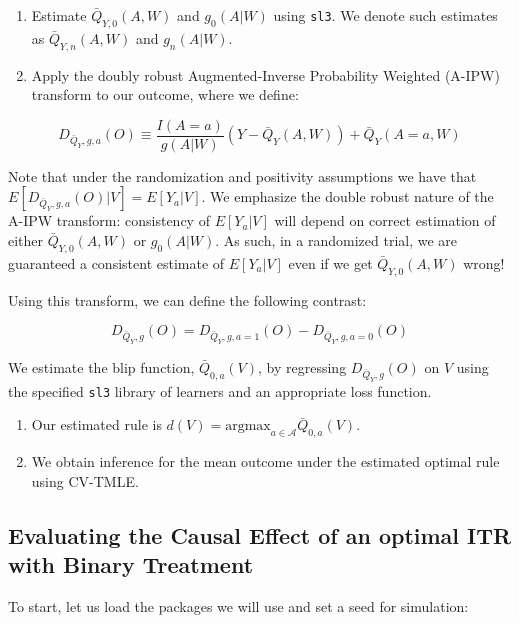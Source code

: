 \documentclass[
  12pt, krantz2,
]{book}
\newcommand{\passthrough}[1]{#1}
\theoremstyle{definition}
\theoremstyle{definition}
\theoremstyle{definition}
\newcommand{\1}{\mathbbm{1}}
\begin{document}
\begin{enumerate}
\def\labelenumi{\arabic{enumi}.}
\item
  Estimate \(\bar{Q}_{Y,0}(A,W)\) and \(g_0(A|W)\) using \passthrough{\lstinline!sl3!}. We denote such
  estimates as \(\bar{Q}_{Y,n}(A,W)\) and \(g_n(A|W)\).
\item
  Apply the doubly robust Augmented-Inverse Probability Weighted (A-IPW)
  transform to our outcome, where we define:
\end{enumerate}

\[D_{\bar{Q}_Y,g,a}(O) \equiv \frac{I(A=a)}{g(A|W)} (Y-\bar{Q}_Y(A,W)) + \bar{Q}_Y(A=a,W)\]

Note that under the randomization and positivity assumptions we have that
\(E[D_{\bar{Q}_Y,g,a}(O) | V] = E[Y_a |V].\) We emphasize the double robust nature
of the A-IPW transform: consistency of \(E[Y_a |V]\) will depend on correct estimation
of either \(\bar{Q}_{Y,0}(A,W)\) or \(g_0(A|W)\). As such, in a randomized trial, we are
guaranteed a consistent estimate of \(E[Y_a |V]\) even if we get \(\bar{Q}_{Y,0}(A,W)\) wrong!

Using this transform, we can define the following contrast:

\[D_{\bar{Q}_Y,g}(O) = D_{\bar{Q}_Y,g,a=1}(O) - D_{\bar{Q}_Y,g,a=0}(O)\]

We estimate the blip function, \(\bar{Q}_{0,a}(V)\), by regressing \(D_{\bar{Q}_Y,g}(O)\) on \(V\) using
the specified \passthrough{\lstinline!sl3!} library of learners and an appropriate loss function.

\begin{enumerate}
\def\labelenumi{\arabic{enumi}.}
\setcounter{enumi}{2}
\item
  Our estimated rule is \(d(V) = \text{argmax}_{a \in \mathcal{A}} \bar{Q}_{0,a}(V)\).
\item
  We obtain inference for the mean outcome under the estimated optimal rule using CV-TMLE.
\end{enumerate}

\hypertarget{evaluating-the-causal-effect-of-an-optimal-itr-with-binary-treatment}{%
\subsection{Evaluating the Causal Effect of an optimal ITR with Binary Treatment}\label{evaluating-the-causal-effect-of-an-optimal-itr-with-binary-treatment}}

To start, let us load the packages we will use and set a seed for simulation:
\end{document}
